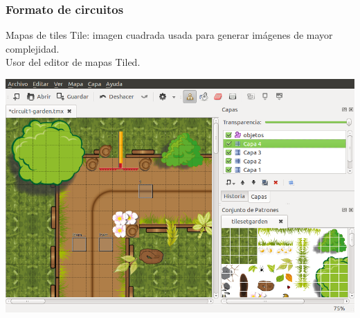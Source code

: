 \begin{frame}
    \frametitle{Formato de circuitos}

    \begin{block}{Mapas de tiles}
        Tile: imagen cuadrada usada para generar imágenes de mayor complejidad.\\
        Usor del editor de mapas Tiled.
    \end{block}   
    

        \begin{center}
                \includegraphics[scale=0.28]{imagenes/captura_tiled.png}
        \end{center}


\end{frame}

